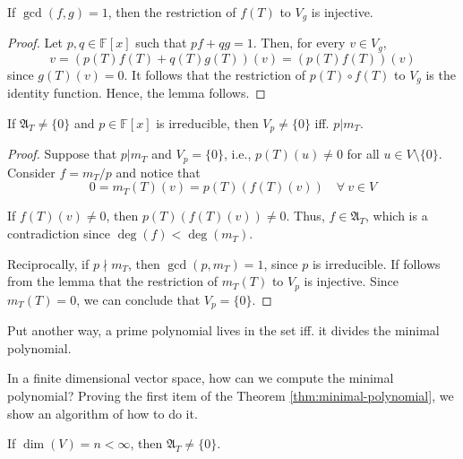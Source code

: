 \begin{lemma}\label{lemma:gcd-restriction}
	If $\gcd(f,g) = 1$, then the restriction of $f(T)$ to $V_g$ is injective.
\end{lemma}

\begin{proof}
	Let $p, q \in \mathbb{F}[x]$ such that $pf + qg = 1$. Then, for every $v \in V_g$,
	\[
		v = (p(T)f(T) + q(T) g(T))(v) = (p(T)f(T))(v)
	\]
	since $g(T)(v) = 0$. It follows that the restriction of $p(T) \circ f(T)$ to $V_g$ is the identity function. Hence, the lemma follows.
\end{proof}

\begin{proposition}
	If $\mathfrak{A}_T \neq \{ 0 \}$ and $p \in \mathbb{F}[x]$ is irreducible, then $V_p \neq \{ 0 \}$ iff. $p | m_T$.
\end{proposition}

\begin{proof}
	Suppose that $p | m_T$ and $V_p = \{ 0 \}$, i.e., $p(T)(u) \neq 0$ for all $u \in V \setminus \{ 0 \}$. Consider $f = m_T / p$ and notice that
	\[
		0 = m_T(T)(v) = p(T)(f(T)(v)) \quad \forall~v \in V
	\]
	
	If $f(T)(v) \neq 0$, then $p(T)(f(T)(v)) \neq 0$. Thus, $f \in \mathfrak{A}_T$, which is a contradiction since $\deg(f) < \deg(m_T)$.
	
	Reciprocally, if $p \nmid m_T$, then $\gcd(p, m_T) = 1$, since $p$ is irreducible. If follows from the lemma that the restriction of $m_T(T)$ to $V_p$ is injective. Since $m_T(T) = 0$, we can conclude that $V_p = \{ 0 \}$. 
\end{proof}

Put another way, a prime polynomial lives in the set iff. it divides the minimal polynomial.

In a finite dimensional vector space, how can we compute the minimal polynomial? Proving the first item of the Theorem \ref{thm:minimal-polynomial}, we show an algorithm of how to do it.

\begin{theorem}
	If $\dim(V) = n < \infty$, then $\mathfrak{A}_T \neq \{ 0 \}$.
\end{theorem}

